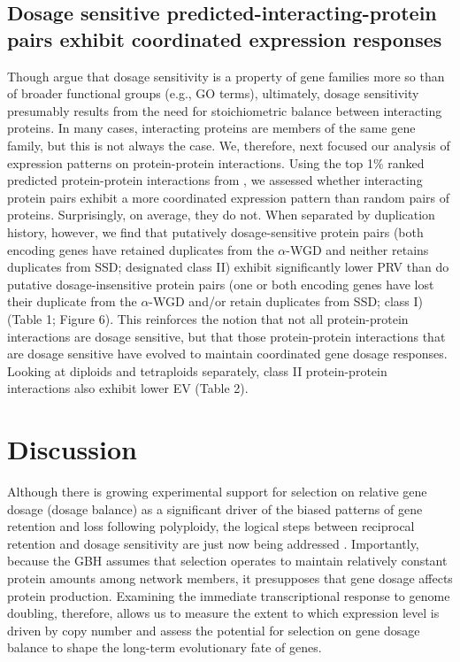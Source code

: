 \documentclass[11pt]{article}
\begin{document}
\subsection*{Dosage sensitive predicted-interacting-protein pairs exhibit coordinated expression responses}

Though \cite{tasdighian2017} argue that dosage sensitivity is a property of gene families more so than of broader functional groups (e.g., GO terms), ultimately, dosage sensitivity presumably results from the need for stoichiometric balance between interacting proteins. In many cases, interacting proteins are members of the same gene family, but this is not always the case. We, therefore, next focused our analysis of expression patterns on protein-protein interactions. Using the top 1\% ranked predicted protein-protein interactions from \cite{dong2019}, we assessed whether interacting protein pairs exhibit a more coordinated expression pattern than random pairs of proteins. Surprisingly, on average, they do not. When separated by duplication history, however, we find that putatively dosage-sensitive protein pairs (both encoding genes have retained duplicates from the $\alpha$-WGD and neither retains duplicates from SSD; designated class II) exhibit significantly lower PRV than do putative dosage-insensitive protein pairs (one or both encoding genes have lost their duplicate from the $\alpha$-WGD and/or retain duplicates from SSD; class I) (Table 1; Figure 6). This reinforces the notion that not all protein-protein interactions are dosage sensitive, but that those protein-protein interactions that are dosage sensitive have evolved to maintain coordinated gene dosage responses. Looking at diploids and tetraploids separately, class II protein-protein interactions also exhibit lower EV (Table 2). 

\section*{Discussion}

Although there is growing experimental support for selection on relative gene dosage (dosage balance) as a significant driver of the biased patterns of gene retention and loss following polyploidy, the logical steps between reciprocal retention and dosage sensitivity are just now being addressed \citep{tasdighian2017, coate2016}. Importantly, because the GBH assumes that selection operates to maintain relatively constant protein amounts among network members, it presupposes that gene dosage affects protein production. Examining the immediate transcriptional response to genome doubling, therefore, allows us to measure the extent to which expression level is driven by copy number and assess the potential for selection on gene dosage balance to shape the long-term evolutionary fate of genes.
\end{document}
